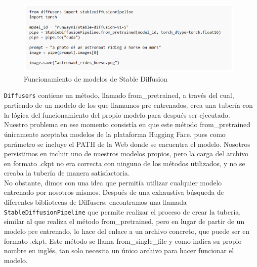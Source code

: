	
	


\begin{figure}[!htb]
	\centering
	\includegraphics[width = 1
	\textwidth]{Imagenes/Vectorial/codigoapp.png}
	\caption{Funcionamiento de modelos de Stable Diffusion}
	\label{fig:codigoapp}
\end{figure}


\texttt{Diffusers} contiene un método, llamado from\_pretrained, a través del cual, partiendo de un modelo de los que llamamos pre entrenados, crea una tubería con la lógica del funcionamiento del propio modelo para después ser ejecutado. Nuestro problema  en ese momento consistía en que este método from\_pretrained únicamente aceptaba modelos de la plataforma Hugging Face, pues como parámetro se incluye el PATH de la Web donde se encuentra el modelo. Nosotros persistimos en incluir uno de nuestros modelos propios, pero la carga del archivo en formato .ckpt no era correcta con ninguno de los métodos utilizados, y no se creaba la tubería de manera satisfactoria. \\

No obstante, dimos con una idea que permitía utilizar cualquier modelo entrenado por nosotros mismos. Después de una exhaustiva búsqueda de diferentes bibliotecas de Diffusers, encontramos una llamada \texttt{StableDiffusionPipeline} que permite realizar el proceso de crear la tubería, similar al que realiza el método from\_pretrained, pero en lugar de partir de un modelo pre entrenado, lo hace del enlace a un archivo concreto, que puede ser en formato .ckpt. Este método se llama from\_single\_file y como indica su propio nombre en inglés, tan solo necesita un único archivo para hacer funcionar el modelo.\\

